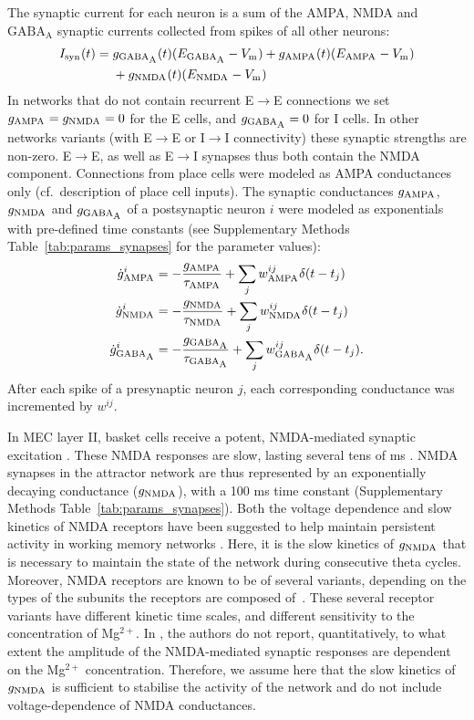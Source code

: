 \documentclass[a4paper,12pt]{article}
\newcommand{\ssc}[3]{\ensuremath{#1_{\text{#2}_{\text{#3}}}}}
\newcommand{\Vm}       {\ssc{V}      {m}     {}}
\newcommand{\Isyn}     {\ssc{I}      {syn}   {}}
\newcommand{\gGABAA}   {\ssc{g}      {\scriptsize{GABA}}{\scriptsize{A}}}
\newcommand{\EGABAA}   {\ssc{E}      {\scriptsize{GABA}}{\scriptsize{A}}}
\newcommand{\tauGABAA} {\ssc{\tau}   {\scriptsize{GABA}}{\scriptsize{A}}}
\newcommand{\gAMPA}    {\ssc{g}      {\scriptsize{AMPA}}{}}
\newcommand{\EAMPA}    {\ssc{E}      {\scriptsize{AMPA}}{}}
\newcommand{\tauAMPA}  {\ssc{\tau}   {\scriptsize{AMPA}}{}}
\newcommand{\gNMDA}    {\ssc{g}      {\scriptsize{NMDA}}{}}
\newcommand{\ENMDA}    {\ssc{E}      {\scriptsize{NMDA}}{}}
\newcommand{\tauNMDA}  {\ssc{\tau}   {\scriptsize{NMDA}}{}}
\newcommand{\dgAMPA} {\ssc{\dot{g}}{\scriptsize{AMPA}}{}}
\newcommand{\dgGABAA}{\ssc{\dot{g}}{\scriptsize{GABA}}{\scriptsize{A}}}
\newcommand{\dgNMDA} {\ssc{\dot{g}}{\scriptsize{NMDA}}{}}
\newcommand{\wAMPA   }{\ssc{w}      {\scriptsize{AMPA}}{}}
\newcommand{\wNMDA   }{\ssc{w}      {\scriptsize{NMDA}}{}}
\newcommand{\wGABAA  }{\ssc{w}      {\scriptsize{GABA}}{\scriptsize{A}}}
\begin{document}
The synaptic current for each neuron is a sum of the AMPA, NMDA and
$\text{GABA}_{\text{A}}$ synaptic currents collected from spikes of all other
neurons:
\begin{align}
    \Isyn(t)  = {} & \gGABAA(t) (\EGABAA - \Vm) + \gAMPA(t) (\EAMPA - \Vm) \notag \\
                & + \gNMDA(t) (\ENMDA - \Vm)
    \label{eq:I_syn}
\end{align}               
In networks that do not contain recurrent E$\rightarrow$E connections we set
$\gAMPA = \gNMDA = 0$ for the E cells, and $\gGABAA = 0$ for I cells. In other
networks variants (with E$\rightarrow$E or I$\rightarrow$I connectivity) these
synaptic strengths are non-zero. E$\rightarrow$E, as well as E$\rightarrow$I
synapses thus both contain the NMDA component. Connections from place cells
were modeled as AMPA conductances only (cf.\ description of place cell inputs).
The synaptic conductances $\gAMPA$, $\gNMDA$ and $\gGABAA$ of a postsynaptic
neuron $i$ were modeled as exponentials with pre-defined time constants (see
Supplementary Methods Table~\ref{tab:params_synapses} for the parameter
values):
\begin{align}
    \dgAMPA^i  &=  -\frac{\gAMPA }{\tauAMPA}  + \sum_j \wAMPA^{ij}  \delta(t - t_j)\notag  \\
    \dgNMDA^i  &=  -\frac{\gNMDA }{\tauNMDA}  + \sum_j \wNMDA^{ij}  \delta(t - t_j)\notag  \\
    \dgGABAA^i &=  -\frac{\gGABAA}{\tauGABAA} + \sum_j \wGABAA^{ij} \delta(t - t_j).
    \label{eq:dgSyn}
\end{align}
After each spike of a presynaptic neuron $j$, each corresponding conductance
was incremented by $w^{ij}$.

In MEC layer II, basket cells receive a potent, NMDA-mediated synaptic
excitation \citep{JONES:1993je}. These NMDA responses are slow, lasting several
tens of ms \citep{JONES:1993je}. NMDA synapses in the attractor network are thus
represented by an exponentially decaying conductance ($\gNMDA$), with a 100 ms
time constant (Supplementary Methods Table~\ref{tab:params_synapses}).
Both the voltage dependence and slow kinetics of NMDA receptors have been
suggested to help maintain persistent activity in working memory networks
\citep{Wang:1999wt}.  Here, it is the slow kinetics of $\gNMDA$ that is
necessary to maintain the state of the network during consecutive theta cycles.
Moreover, NMDA receptors are known to be of several variants, depending on the
types of the subunits the receptors are composed of~\citep{Paoletti:2013ht}.
These several receptor variants have different kinetic time scales, and
different sensitivity to the concentration of Mg$^{2+}$. In
\citep{JONES:1993je}, the authors
do not report, quantitatively, to what extent the amplitude of the
NMDA-mediated synaptic responses are dependent on the Mg$^{2+}$ concentration.
Therefore, we assume here that the slow kinetics of $\gNMDA$ is sufficient to
stabilise the activity of the network and do not include voltage-dependence of
NMDA conductances.
\end{document}
